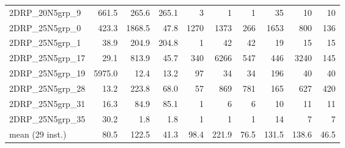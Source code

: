 \documentclass[a4paper,10pt]{article}
\theoremstyle{definition}
\begin{document}
\begin{table}[t]
\begin{scriptsize}
\begin{tabular*}{\textwidth}{@{}l@{\;\;\extracolsep{\fill}}rrrrrrrrr@{}}
  2DRP\_20N5grp\_9 & \num{ 661.5} & \num{ 265.6} & \num{ 265.1} & \num{         3} & \num{         1} & \num{         1} & \num{        35} & \num{        10} & \num{        10}\\
  2DRP\_25N5grp\_0 & \num{ 423.3} & \num{1868.5} & \num{  47.8} & \num{      1270} & \num{      1373} & \num{       266} & \num{      1653} & \num{       800} & \num{       136}\\
  2DRP\_25N5grp\_1 & \num{  38.9} & \num{ 204.9} & \num{ 204.8} & \num{         1} & \num{        42} & \num{        42} & \num{        19} & \num{        15} & \num{        15}\\
 2DRP\_25N5grp\_17 & \num{  29.1} & \num{ 813.9} & \num{  45.7} & \num{       340} & \num{      6266} & \num{       547} & \num{       446} & \num{      3240} & \num{       145}\\
 2DRP\_25N5grp\_19 & \num{5975.0} & \num{  12.4} & \num{  13.2} & \num{        97} & \num{        34} & \num{        34} & \num{       196} & \num{        40} & \num{        40}\\
 2DRP\_25N5grp\_28 & \num{  13.2} & \num{ 223.8} & \num{  68.0} & \num{        57} & \num{       869} & \num{       781} & \num{       165} & \num{       627} & \num{       420}\\
 2DRP\_25N5grp\_31 & \num{  16.3} & \num{  84.9} & \num{  85.1} & \num{         1} & \num{         6} & \num{         6} & \num{        10} & \num{        11} & \num{        11}\\
 2DRP\_25N5grp\_35 & \num{  30.2} & \num{   1.8} & \num{   1.8} & \num{         1} & \num{         1} & \num{         1} & \num{        14} & \num{         7} & \num{         7}\\
\midrule
mean (29 inst.) & \num{  80.5} & \num{ 122.5} & \num{  41.3} & \num{      98.4} & \num{     221.9} & \num{      76.5} & \num{     131.5} & \num{     138.6} & \num{      46.5}\\
    \bottomrule
  \end{tabular*}
  \end{scriptsize}
\end{table}
\end{document}
